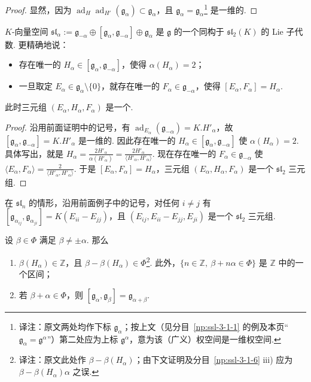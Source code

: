 \begin{proof}
显然，因为 $\operatorname{ad}_H\operatorname{ad}_{H'}(\mathfrak g_\alpha)\subset\mathfrak g_\alpha$，且 $\mathfrak g_\alpha=\mathfrak g_\alpha$\footnote{译注：原文两处均作下标 $\mathfrak g_\alpha$；按上文（见分目~\ref{np:ssl-3-1-1} 的例及本页``$\mathfrak g_\alpha=\mathfrak g^\alpha$''）第二处应为上标 $\mathfrak g^\alpha$，意为该（广义）权空间是一维权空间.} 是一维的.
\end{proof}
\begin{corollary}\label{cor:ssl-3-1-4}
$K$-向量空间 $\mathfrak{sl}_\alpha:=\mathfrak g_{-\alpha}\oplus[\mathfrak g_\alpha,\mathfrak g_{-\alpha}]\oplus\mathfrak g_\alpha$ 是 $\mathfrak g$ 的一个同构于 $\mathfrak{sl}_2(K)$ 的 Lie 子代数. 更精确地说：
\begin{itemize}
\item 存在唯一的 $H_\alpha\in[\mathfrak g_\alpha,\mathfrak g_{-\alpha}]$，使得 $\alpha(H_\alpha)=2$；
\item 一旦取定 $E_\alpha\in\mathfrak g_\alpha\setminus\{0\}$，就存在唯一的 $F_\alpha\in\mathfrak g_{-\alpha}$，使得 $[E_\alpha,F_\alpha]=H_\alpha$.
\end{itemize}
此时三元组 $(E_\alpha,H_\alpha,F_\alpha)$ 是一个.
\end{corollary}
\begin{proof}
沿用前面证明中的记号，有 $\operatorname{ad}_{E_\alpha}(\mathfrak g_{-\alpha})=K.H'_\alpha$，故 $[\mathfrak g_\alpha,\mathfrak g_{-\alpha}]=K.H'_\alpha$ 是一维的. 因此存在唯一的 $H_\alpha\in[\mathfrak g_\alpha,\mathfrak g_{-\alpha}]$ 使 $\alpha(H_\alpha)=2$. 具体写出，就是 $H_\alpha=\frac{2H'_\alpha}{\alpha(H'_\alpha)}=\frac{2H'_\alpha}{\langle H'_\alpha,H'_\alpha\rangle}$. 现在存在唯一的 $F_\alpha\in\mathfrak g_{-\alpha}$ 使 $\langle E_\alpha,F_\alpha\rangle=\frac{2}{\langle H'_\alpha,H'_\alpha\rangle}$. 于是 $[E_\alpha,F_\alpha]=H_\alpha$，三元组 $(E_\alpha,H_\alpha,F_\alpha)$ 是一个 $\mathfrak{sl}_2$ 三元组.
\end{proof}
\begin{example*}
在 $\mathfrak{sl}_n$ 的情形，沿用前面例子中的记号，对任何 $i\neq j$ 有 $[\mathfrak g_{\alpha_{ij}},\mathfrak g_{\alpha_{ji}}]=K(E_{ii}-E_{jj})$，且 $(E_{ij},E_{ii}-E_{jj},E_{ji})$ 是一个 $\mathfrak{sl}_2$ 三元组.
\end{example*}
\begin{proposition}\label{prop:ssl-3-1-5}
设 $\beta\in\Phi$ 满足 $\beta\neq\pm\alpha$. 那么
\begin{enumerate}[label=\roman*)]
\item $\beta(H_\alpha)\in\mathbb Z$，且 $\beta-\beta(H_\alpha)\in\Phi$\footnote{译注：原文此处作 $\beta-\beta(H_\alpha)$；由下文证明及分目~\ref{np:ssl-3-1-6} iii) 应为 $\beta-\beta(H_\alpha)\alpha$ 之误.}. 此外，$\{n\in\mathbb Z,\ \beta+n\alpha\in\Phi\}$ 是 $\mathbb Z$ 中的一个区间；
\item 若 $\beta+\alpha\in\Phi$，则 $[\mathfrak g_\alpha,\mathfrak g_\beta]=\mathfrak g_{\alpha+\beta}$.
\end{enumerate}
\end{proposition}

